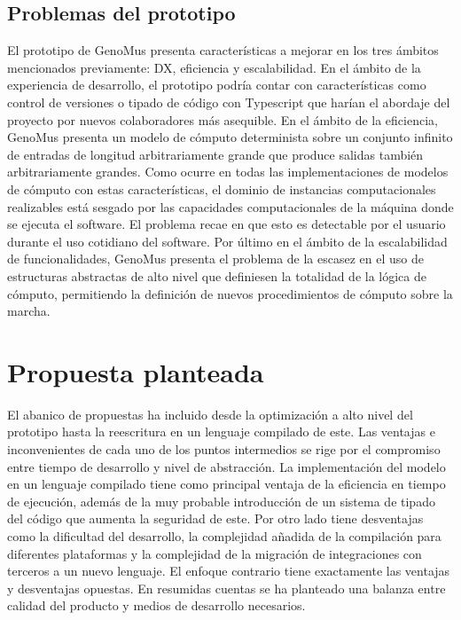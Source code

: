 \subsection{Problemas del prototipo}
El prototipo de GenoMus presenta características a mejorar en los tres ámbitos mencionados previamente: DX, eficiencia y escalabilidad. En el ámbito de la experiencia de desarrollo, el prototipo podría contar con características como control de versiones o tipado de código con Typescript que harían el abordaje del proyecto por nuevos colaboradores más asequible. En el ámbito de la eficiencia, GenoMus presenta un modelo de cómputo determinista sobre un conjunto infinito de entradas de longitud arbitrariamente grande que produce salidas también arbitrariamente grandes. Como ocurre en todas las implementaciones de modelos de cómputo con estas características, el dominio de instancias computacionales realizables está sesgado por las capacidades computacionales de la máquina donde se ejecuta el software. El problema recae en que esto es detectable por el usuario durante el uso cotidiano del software. Por último en el ámbito de la escalabilidad de funcionalidades, GenoMus presenta el problema de la escasez en el uso de estructuras abstractas de alto nivel que definiesen la totalidad de la lógica de cómputo, permitiendo la definición de nuevos procedimientos de cómputo sobre la marcha.

\section{Propuesta planteada}

El abanico de propuestas ha incluido desde la optimización a alto nivel del prototipo hasta la reescritura en un lenguaje compilado de este. Las ventajas e inconvenientes de cada uno de los puntos intermedios se rige por el compromiso entre tiempo de desarrollo y nivel de abstracción. La implementación del modelo en un lenguaje compilado tiene como principal ventaja de la eficiencia en tiempo de ejecución, además de la muy probable introducción de un sistema de tipado del código que aumenta la seguridad de este. Por otro lado tiene desventajas como la dificultad del desarrollo, la complejidad añadida de la compilación para diferentes plataformas y la complejidad de la migración de integraciones con terceros a un nuevo lenguaje. El enfoque contrario tiene exactamente las ventajas y desventajas opuestas. En resumidas cuentas se ha planteado una balanza entre calidad del producto y medios de desarrollo necesarios.

